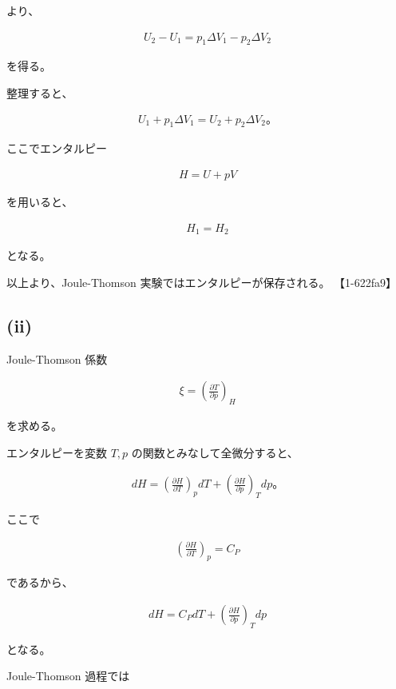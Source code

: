\documentclass[platex,dvipdfmx,a4paper]{jsarticle}
\begin{document}
より、

\begin{align*}
U_2-U_1
=
p_1\Delta V_1-p_2\Delta V_2
\end{align*}

を得る。

整理すると、

\begin{align*}
U_1+p_1\Delta V_1
=
U_2+p_2\Delta V_2。
\end{align*}

ここでエンタルピー

\begin{align*}
H=U+pV
\end{align*}

を用いると、

\begin{align*}
H_1=H_2
\end{align*}

となる。

以上より、Joule-Thomson 実験ではエンタルピーが保存される。 【1-622fa9】

\subsection{(ii)}

Joule-Thomson 係数

\begin{align*}
\xi
=
\left(
\frac{\partial T}{\partial p}
\right)_H
\end{align*}

を求める。

エンタルピーを変数 $T,p$ の関数とみなして全微分すると、

\begin{align*}
dH
=
\left(
\frac{\partial H}{\partial T}
\right)_p dT
+
\left(
\frac{\partial H}{\partial p}
\right)_T dp。
\end{align*}

ここで

\begin{align*}
\left(
\frac{\partial H}{\partial T}
\right)_p
=
C_P
\end{align*}

であるから、

\begin{align*}
dH
=
C_P dT
+
\left(
\frac{\partial H}{\partial p}
\right)_T dp
\end{align*}

となる。

Joule-Thomson 過程では
\end{document}
